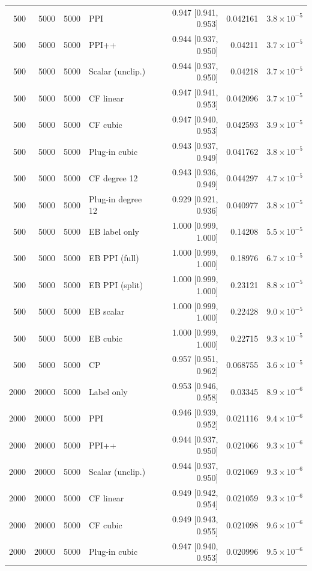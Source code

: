 {\begin{longtable}{rrrlrrr}
500 & 5000 & 5000 & PPI & 0.947 [0.941, 0.953] & 0.042161 & $3.8\times 10^{-5}$ \\
500 & 5000 & 5000 & PPI++ & 0.944 [0.937, 0.950] & 0.04211 & $3.7\times 10^{-5}$ \\
500 & 5000 & 5000 & Scalar (unclip.) & 0.944 [0.937, 0.950] & 0.04218 & $3.7\times 10^{-5}$ \\
500 & 5000 & 5000 & CF linear & 0.947 [0.941, 0.953] & 0.042096 & $3.7\times 10^{-5}$ \\
500 & 5000 & 5000 & CF cubic & 0.947 [0.940, 0.953] & 0.042593 & $3.9\times 10^{-5}$ \\
500 & 5000 & 5000 & Plug-in cubic & 0.943 [0.937, 0.949] & 0.041762 & $3.8\times 10^{-5}$ \\
500 & 5000 & 5000 & CF degree 12 & 0.943 [0.936, 0.949] & 0.044297 & $4.7\times 10^{-5}$ \\
500 & 5000 & 5000 & Plug-in degree 12 & 0.929 [0.921, 0.936] & 0.040977 & $3.8\times 10^{-5}$ \\
500 & 5000 & 5000 & EB label only & 1.000 [0.999, 1.000] & 0.14208 & $5.5\times 10^{-5}$ \\
500 & 5000 & 5000 & EB PPI (full) & 1.000 [0.999, 1.000] & 0.18976 & $6.7\times 10^{-5}$ \\
500 & 5000 & 5000 & EB PPI (split) & 1.000 [0.999, 1.000] & 0.23121 & $8.8\times 10^{-5}$ \\
500 & 5000 & 5000 & EB scalar & 1.000 [0.999, 1.000] & 0.22428 & $9.0\times 10^{-5}$ \\
500 & 5000 & 5000 & EB cubic & 1.000 [0.999, 1.000] & 0.22715 & $9.3\times 10^{-5}$ \\
500 & 5000 & 5000 & CP & 0.957 [0.951, 0.962] & 0.068755 & $3.6\times 10^{-5}$ \\
2000 & 20000 & 5000 & Label only & 0.953 [0.946, 0.958] & 0.03345 & $8.9\times 10^{-6}$ \\
2000 & 20000 & 5000 & PPI & 0.946 [0.939, 0.952] & 0.021116 & $9.4\times 10^{-6}$ \\
2000 & 20000 & 5000 & PPI++ & 0.944 [0.937, 0.950] & 0.021066 & $9.3\times 10^{-6}$ \\
2000 & 20000 & 5000 & Scalar (unclip.) & 0.944 [0.937, 0.950] & 0.021069 & $9.3\times 10^{-6}$ \\
2000 & 20000 & 5000 & CF linear & 0.949 [0.942, 0.954] & 0.021059 & $9.3\times 10^{-6}$ \\
2000 & 20000 & 5000 & CF cubic & 0.949 [0.943, 0.955] & 0.021098 & $9.6\times 10^{-6}$ \\
2000 & 20000 & 5000 & Plug-in cubic & 0.947 [0.940, 0.953] & 0.020996 & $9.5\times 10^{-6}$ \\

\end{longtable}}
